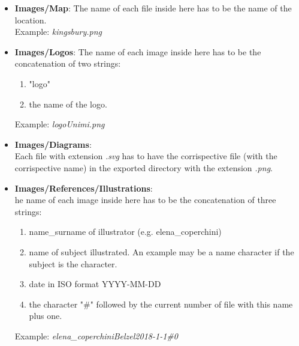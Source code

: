 \documentclass[12pt]{article}
\begin{document}
\begin{itemize}
  \item \textbf{Images/Map}:
  The name of each file inside here has to be the name of the location.\\
  Example: \textit{kingsbury.png}

  \item \textbf{Images/Logos}:
  The name of each image inside here has to be the concatenation of two strings:
  \begin{enumerate}
    \item "logo"
    \item the name of the logo.
  \end{enumerate}
  Example: \textit{logoUnimi.png}

  \item \textbf{Images/Diagrams}: \\Each file with extension \textit{.svg} has to have the corrispective file (with the corrispective name) in the exported directory with the extension \textit{.png}.

  \item \textbf{Images/References/Illustrations}:\\
  he name of each image inside here has to be the concatenation of three strings:
  \begin{enumerate}
  \item name\_surname of illustrator (e.g. elena\_coperchini)
  \item name of subject illustrated. An example may be a name character if the subject is the character.
  \item date in ISO format YYYY-MM-DD
  \item the character "\#" followed by the current number of file with this name plus one.
  \end{enumerate}
  Example: \textit{elena\_coperchiniBelzel2018-1-1\#0}

\end{itemize}
\end{document}
